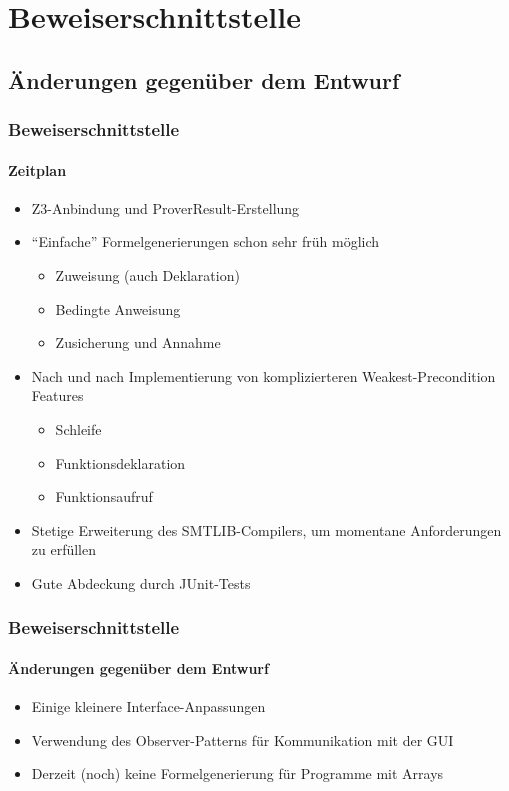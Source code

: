 \section{Beweiserschnittstelle}

\subsection{Änderungen gegenüber dem Entwurf}
\begin{frame}
\frametitle{Beweiserschnittstelle}
\framesubtitle{Zeitplan}
\begin{itemize}
    \item<+-> Z3-Anbindung und ProverResult-Erstellung
	\item<+-> ``Einfache'' Formelgenerierungen schon sehr früh möglich
    \begin{itemize}
        \item<+-> Zuweisung (auch Deklaration)
        \item<+-> Bedingte Anweisung
        \item<+-> Zusicherung und Annahme
    \end{itemize}
	\item<+-> Nach und nach Implementierung von komplizierteren Weakest-Precondition Features
    \begin{itemize}
        \item<+-> Schleife
        \item<+-> Funktionsdeklaration
        \item<+-> Funktionsaufruf
    \end{itemize}
	\item<+-> Stetige Erweiterung des SMTLIB-Compilers, um momentane Anforderungen zu erfüllen
	\item<+-> Gute Abdeckung durch JUnit-Tests
\end{itemize}
\end{frame}

\begin{frame}
\frametitle{Beweiserschnittstelle}
\framesubtitle{Änderungen gegenüber dem Entwurf}
\begin{itemize}
	\item<+-> Einige kleinere Interface-Anpassungen
	\item<+-> Verwendung des Observer-Patterns für Kommunikation mit der GUI
	\item<+-> Derzeit (noch) keine Formelgenerierung für Programme mit Arrays
\end{itemize}
\end{frame}

